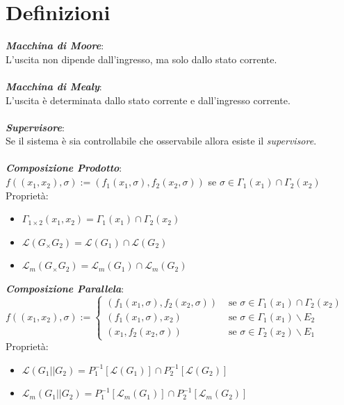 \documentclass[a4paper, notitlepage, 10pt]{report}
\begin{document}
\chapter*{Definizioni}
\textit{\textbf{Macchina di Moore}}:\\L'uscita non dipende dall'ingresso, ma solo dallo stato corrente.
\\\\
\textit{\textbf{Macchina di Mealy}}:\\L'uscita è determinata dallo stato corrente e dall'ingresso corrente.
\\\\
\textit{\textbf{Supervisore}}:\\Se il sistema è sia controllabile che osservabile allora esiste il \textit{supervisore}.
\\\\
\textit{\textbf{Composizione Prodotto}}:\\$f ((x_1,x_2), \sigma) := (f_1(x_1,\sigma), f_2(x_2,\sigma))$ se $\sigma\in \Gamma_1 (x_1) \cap \Gamma_2(x_2)$
\\
Proprietà:\begin{itemize}
	\item $\Gamma_{1 \times 2} (x_1, x_2) = \Gamma_1 (x_1) \cap \Gamma_2(x_2)$
	\item $\mathcal{L} (G_ \times G_2) = \mathcal{L}(G_1) \cap \mathcal{L} (G_2)$
	\item $\mathcal{L}_m (G_ \times G_2) = \mathcal{L}_m(G_1) \cap \mathcal{L}_m (G_2)$
\end{itemize}
\noindent
\textit{\textbf{Composizione Parallela}}:\\
$f ((x_1,x_2), \sigma)  := 
\begin{cases}
(f_1(x_1,\sigma), f_2(x_2,\sigma)) &\text{ se } \sigma\in \Gamma_1 (x_1) \cap \Gamma_2(x_2) \\
(f_1(x_1,\sigma), x_2) & \text{ se } \sigma\in \Gamma_1 (x_1) \backslash E_2\\
(x_1, f_2(x_2,\sigma)) & \text{ se } \sigma\in \Gamma_2 (x_2) \backslash E_1
\end{cases}$
\\
Proprietà:\begin{itemize}
\item $\mathcal{L} (G_1 || G_2) = P^{-1}_1[\mathcal{L}(G_1)] \cap P^{-1}_2[\mathcal{L}(G_2)]$
\item $\mathcal{L}_m (G_1 || G_2) = P^{-1}_1[\mathcal{L}_m(G_1)] \cap P^{-1}_2[\mathcal{L}_m(G_2)]$
\end{itemize}
\end{document}
